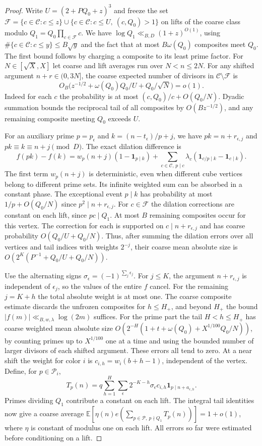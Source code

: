 \documentclass[11pt,letterpaper]{article}
\begin{document}
\begin{proof}
Write $U=(2+P Q_0+z)^3$ and freeze the set
$\mathcal F=\{c\in\mathcal C:c\le z\}\cup
\{c\in\mathcal C:c\le U,\ (c,Q_0)>1\}$ on lifts of the coarse class
modulo $Q_1=Q_0\prod_{c\in\mathcal F}c$. We have
$\log Q_1\ll_{B,D}(1+z)^{O(1)}$, using
$\#\{c\in\mathcal C:c\le y\}\le B\sqrt y$ and the fact that at most
$B\omega(Q_0)$ composites meet $Q_0$. The first bound follows by
charging a composite to its least prime factor. For $N\in[\sqrt X,X]$
let coarse and lift averages run over $N<n\le2N$. For any shifted
argument $n+r\in(0,3N]$, the coarse expected number of divisors in
$\mathcal C\setminus\mathcal F$ is
\[
 O_B\big(z^{-1/2}+\omega(Q_0)Q_0/U+Q_0/\sqrt N\big)=o(1).
\]
Indeed for each $c$ the probability is at most $(c,Q_0)/c+O(Q_0/N)$.
Dyadic summation bounds the reciprocal tail of all composites by
$O(Bz^{-1/2})$, and any remaining composite meeting $Q_0$ exceeds $U$.

For an auxiliary prime $p=p_\epsilon$ and $k=(n-t_\epsilon)/p+j$,
we have $pk=n+r_{\epsilon,j}$ and $pk\equiv k\equiv n+j\pmod D$.
The exact dilation difference is
\[
 f(pk)-f(k)=w_p(n+j)(1-\mathbf1_{p\mid k})
   +\sum_{c\in\mathcal C,\,p\mid c}\lambda_c
     (\mathbf1_{c/p\mid k}-\mathbf1_{c\mid k}).
\]
The first term $w_p(n+j)$ is deterministic, even when different cube
vertices belong to different prime sets. Its infinite weighted sum
can be absorbed in a constant phase. The exceptional event $p\mid k$
has probability at most $1/p+O(Q_0/N)$ since $p^2\mid n+r_{\epsilon,j}$.
For $c\in\mathcal F$ the dilation corrections are constant on each lift,
since $pc\mid Q_1$. At most $B$ remaining composites occur for this
vertex. The correction for each is supported on $c\mid n+r_{\epsilon,j}$
and has coarse probability $O(Q_0/U+Q_0/N)$. Thus, after summing the
dilation errors over all vertices and tail indices with weights
$2^{-j}$, their coarse mean absolute size is $O(2^K(P^{-1}+Q_0/U+Q_0/N))$.

Use the alternating signs $\sigma_\epsilon=(-1)^{\sum_j\epsilon_j}$.
For $j\le K$, the argument $n+r_{\epsilon,j}$ is independent of
$\epsilon_j$, so the values of the entire $f$ cancel. For the remaining
$j=K+h$ the total absolute weight is at most one. The coarse composite
estimate discards the unfrozen composites for $h\le H_+$, and beyond
$H_+$ the bound $|f(m)|\ll_{B,w,\lambda}\log(2m)$ suffices. For
the prime part the tail $H<h\le H_+$ has coarse weighted mean absolute
size $O(2^{-H}(1+t+\omega(Q_0)+X^{1/100}Q_0/N))$, by counting primes
up to $X^{1/100}$ one at a time and using the bounded number of larger
divisors of each shifted argument. These errors all tend to zero.
At a near shift the weight for color $i$ is
$c_{i,h}=w_i(b+h-1)$, independent of the vertex. Define, for
$p\in\mathcal P_i$,
\[
 T_p(n)=q\sum_{h=1}^H\sum_\epsilon 2^{-K-h}\sigma_\epsilon c_{i,h}
                         \mathbf1_{p\mid n+a_{\epsilon,h}}.
\]
Primes dividing $Q_1$ contribute a constant on each lift. The integral
tail identities now give a coarse average
$\mathbb E[\eta(n)e(\sum_{p\in\mathcal P,\ p\nmid Q_1}T_p(n))]=1+o(1)$,
where $\eta$ is constant of modulus one on each lift. All errors so far
were estimated before conditioning on a lift.


\end{proof}
\end{document}
